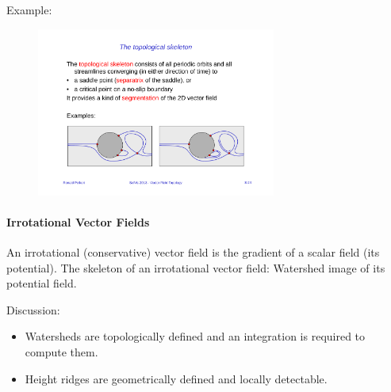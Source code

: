Example:
\begin{figure}[H]
    \centering
    \includegraphics[width=0.7\textwidth]{img/08_topological_skeleton}
\end{figure}

\paragraph{Irrotational Vector Fields} An irrotational (conservative) vector field is the gradient of a scalar field (its potential). The skeleton of an irrotational vector field: Watershed image of its potential field. 

Discussion:
\begin{itemize}
    \item Watersheds are topologically defined and an integration is required to compute them.
    \item Height ridges are geometrically defined and locally detectable.
\end{itemize}

